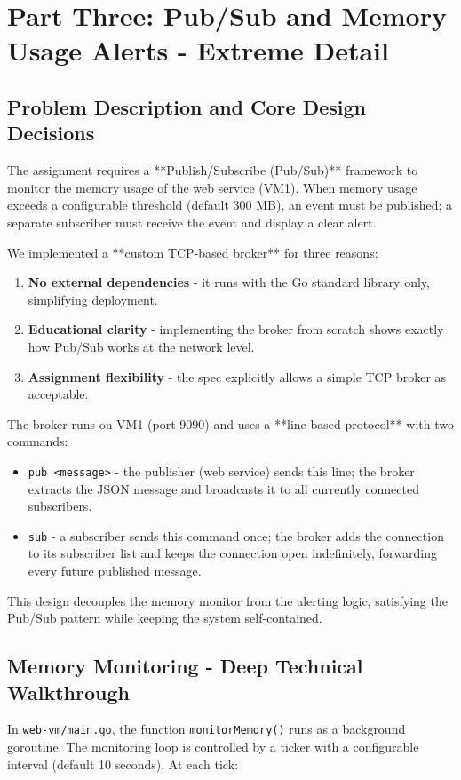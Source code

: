 \documentclass[a4paper]{article}
\begin{document}
\section{Part Three: Pub/Sub and Memory Usage Alerts - Extreme Detail}

\subsection{Problem Description and Core Design Decisions}
The assignment requires a **Publish/Subscribe (Pub/Sub)** framework to monitor the memory usage of the web service (VM1). When memory usage exceeds a configurable threshold (default 300 MB), an event must be published; a separate subscriber must receive the event and display a clear alert.

We implemented a **custom TCP-based broker** for three reasons:
\begin{enumerate}
    \item \textbf{No external dependencies} - it runs with the Go standard library only, simplifying deployment.
    \item \textbf{Educational clarity} - implementing the broker from scratch shows exactly how Pub/Sub works at the network level.
    \item \textbf{Assignment flexibility} - the spec explicitly allows a simple TCP broker as acceptable.
\end{enumerate}

The broker runs on VM1 (port 9090) and uses a **line-based protocol** with two commands:
\begin{itemize}
    \item \texttt{pub <message>} - the publisher (web service) sends this line; the broker extracts the JSON message and broadcasts it to all currently connected subscribers.
    \item \texttt{sub} - a subscriber sends this command once; the broker adds the connection to its subscriber list and keeps the connection open indefinitely, forwarding every future published message.
\end{itemize}

This design decouples the memory monitor from the alerting logic, satisfying the Pub/Sub pattern while keeping the system self-contained.

\subsection{Memory Monitoring - Deep Technical Walkthrough}
In \texttt{web-vm/main.go}, the function \texttt{monitorMemory()} runs as a background goroutine. The monitoring loop is controlled by a ticker with a configurable interval (default 10 seconds). At each tick:
\end{document}
